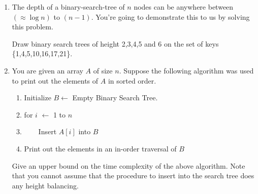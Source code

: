 \begin{enumerate}

\item  The depth of a binary-search-tree of $n$ nodes can be anywhere  
between $(\approx  \log  n)$ to $(n-1)$. You're going to demonstrate
this to us by solving this problem.

Draw binary search trees of height 2,3,4,5 and 6 on the set of keys
\{1,4,5,10,16,17,21\}. 

\item  You are given an array $A$ of size $n$. Suppose the following
algorithm was used to print out the elements of $A$ in sorted order.

\begin{enumerate}
\item  Initialize $B \leftarrow$  Empty Binary Search Tree.
\item  for $i$ $\leftarrow$  1 to $n$
\item  ~~~~Insert $A[i]$ into $B$
\item  Print out the elements in an in-order traversal of $B$
\end{enumerate}

Give an upper bound on the time complexity of the above
algorithm. Note that you cannot assume that the procedure to insert
into the search tree does any height balancing.

\end{enumerate}




